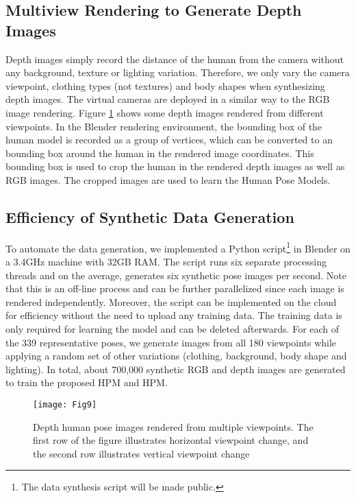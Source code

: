 \documentclass[twocolumn]{svjour3}          \smartqed  \usepackage{graphicx}
\begin{document}
\subsection{Multiview Rendering to Generate Depth Images}

Depth images simply record the distance of the human from the camera without any background, texture or lighting variation. Therefore, we only vary the camera viewpoint, clothing types (not textures) and body shapes when synthesizing depth images. The virtual cameras are deployed in a similar way to the RGB image rendering. Figure \ref{fig:depth_mv_samples} shows some depth images rendered from different viewpoints. In the Blender rendering environment, the bounding box of the human model is recorded as a group of vertices, which can be converted to an  bounding box around the human in the rendered image  coordinates. This bounding box is used to crop the human in the rendered depth images as well as RGB images. The cropped images are used to learn the Human Pose Models.



\subsection{Efficiency of Synthetic Data Generation}

To automate the data generation, we implemented a Python script\footnote{The data synthesis script will be made public.} in Blender on a 3.4GHz machine with 32GB RAM. The script runs six separate processing threads and on the average, generates six synthetic pose images per second. Note that this is an off-line process and can be further parallelized since each image is rendered independently. Moreover, the script can be implemented on the cloud for efficiency without the need to upload any training data. The training data is only required for learning the model and can be deleted afterwards. For each of the 339 representative poses, we generate images from all 180 viewpoints while applying a random set of other variations (clothing, background, body shape and lighting). In total, about 700,000 synthetic RGB and depth images are generated to train the proposed HPM and HPM.


\begin{figure}[t]
\centering
\texttt{[image: Fig9]}
\caption{Depth human pose images rendered from multiple viewpoints. The first row of the figure illustrates horizontal viewpoint change, and the second row illustrates vertical viewpoint change}
\label{fig:depth_mv_samples}
\vspace{-1mm}
\end{figure}
\end{document}
